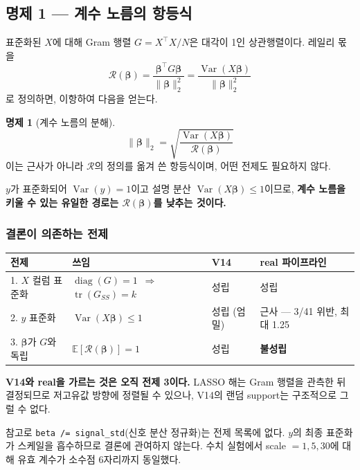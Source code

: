 \documentclass[11pt,a4paper]{article}
\theoremstyle{definition}
\newtheorem{proposition}{명제}
\newcommand{\R}{\mathcal{R}}
\newcommand{\bbeta}{\boldsymbol{\beta}}
\begin{document}
\subsection{명제 1 --- 계수 노름의 항등식}

표준화된 \(X\)에 대해 Gram 행렬 \(G=X^\top X/N\)은 대각이 1인 상관행렬이다. 레일리 몫을
\[
\R(\bbeta)=\frac{\bbeta^\top G\bbeta}{\lVert\bbeta\rVert_2^{2}}=\frac{\operatorname{Var}(X\bbeta)}{\lVert\bbeta\rVert_2^{2}}
\]
로 정의하면, 이항하여 다음을 얻는다.

\begin{proposition}[계수 노름의 분해]
\[
\boxed{\ \lVert\bbeta\rVert_2=\sqrt{\frac{\operatorname{Var}(X\bbeta)}{\R(\bbeta)}}\ }
\]
이는 근사가 아니라 \(\R\)의 정의를 옮겨 쓴 항등식이며, 어떤 전제도 필요하지 않다.
\end{proposition}

\(y\)가 표준화되어 \(\operatorname{Var}(y)=1\)이고 설명 분산 \(\operatorname{Var}(X\bbeta)\le1\)이므로, \textbf{계수 노름을 키울 수 있는 유일한 경로는 \(\R(\bbeta)\)를 낮추는 것이다.}

\subsubsection{결론이 의존하는 전제}

\begin{center}
\small
\begin{tabular}{@{}p{4.6cm}p{4.0cm}p{2.4cm}p{3.2cm}@{}}
\toprule
\textbf{전제} & \textbf{쓰임} & \textbf{V14} & \textbf{real 파이프라인}\\
\midrule
1. \(X\) 컬럼 표준화 & \(\operatorname{diag}(G)=1\)\ \(\Rightarrow\)\ \(\operatorname{tr}(G_{SS})=k\) & 성립 & 성립\\
2. \(y\) 표준화 & \(\operatorname{Var}(X\bbeta)\le1\) & 성립 (엄밀) & 근사 --- 3/41 위반, 최대 1.25\\
3. \(\bbeta\)가 \(G\)와 독립 & \(\mathbb{E}[\R(\bbeta)]=1\) & 성립 & \textbf{불성립}\\
\bottomrule
\end{tabular}
\end{center}

\textbf{V14와 real을 가르는 것은 오직 전제 3이다.} LASSO 해는 Gram 행렬을 관측한 뒤 결정되므로 저고유값 방향에 정렬될 수 있으나, V14의 랜덤 support는 구조적으로 그럴 수 없다.

\begin{notebox}
\small
참고로 \verb|beta /= signal_std|(신호 분산 정규화)는 전제 목록에 없다. \(y\)의 최종 표준화가 스케일을 흡수하므로 결론에 관여하지 않는다. 수치 실험에서 scale \(=1,5,30\)에 대해 유효 계수가 소수점 6자리까지 동일했다.
\end{notebox}
\end{document}
